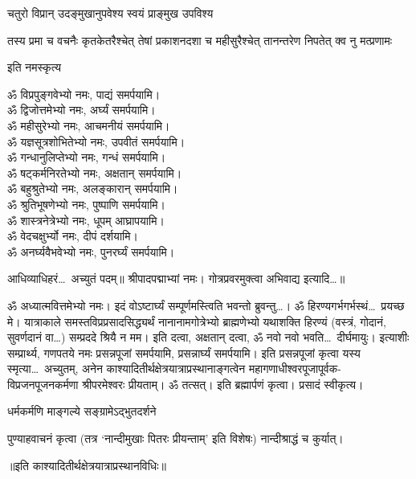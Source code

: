 
चतुरो विप्रान् उदङ्मुखानुपवेश्य स्वयं प्राङ्मुख उपविश्य

\begin{center}
{तस्य प्रमा च वचनैः कृतकेतरैश्चेत्}
{तेषां प्रकाशनदशा च महीसुरैश्चेत्}
{तानन्तरेण निपतेत् क्व नु मत्प्रणामः}
\end{center}

इति नमस्कृत्य

\begin{center}
ॐ विप्रपुङ्गवेभ्यो नमः, पाद्यं समर्पयामि।\\
ॐ द्विजोत्तमेभ्यो नमः, अर्घ्यं समर्पयामि।\\
ॐ महीसुरेभ्यो नमः, आचमनीयं समर्पयामि।\\
ॐ यज्ञसूत्रशोभितेभ्यो नमः, उपवीतं समर्पयामि।\\
ॐ गन्धानुलिप्तेभ्यो नमः, गन्धं समर्पयामि।\\
ॐ षट्कर्मनिरतेभ्यो नमः, अक्षतान् समर्पयामि।\\
ॐ बहुश्रुतेभ्यो नमः, अलङ्कारान् समर्पयामि।\\
ॐ श्रुतिभूषणेभ्यो नमः, पुष्पाणि समर्पयामि।\\
ॐ शास्त्रनेत्रेभ्यो नमः, धूपम् आघ्रापयामि।\\
ॐ वेदचक्षुर्भ्यो नमः, दीपं दर्शयामि।\\
ॐ अनर्घ्यवैभवेभ्यो नमः, पुनरर्घ्यं समर्पयामि।
\end{center}


आधिव्याधिहरं\ldots\ अच्युतं पदम्॥ श्रीपादपद्माभ्यां नमः।
गोत्रप्रवरमुक्त्वा अभिवाद्य इत्यादि\ldots॥

ॐ अध्यात्मवित्तमेभ्यो नमः। इदं वोऽष्टार्घ्यं सम्पूर्णमस्त्विति भवन्तो ब्रुवन्तु\ldots।
ॐ हिरण्यगर्भगर्भस्थं\ldots\ प्रयच्छ मे।
यात्राकाले समस्तविप्रप्रसादसिद्ध्यर्थं नानानामगोत्रेभ्यो ब्राह्मणेभ्यो यथाशक्ति हिरण्यं
(वस्त्रं, गोदानं, सुवर्णदानं वा\ldots) सम्प्रददे श्रियै न मम। इति दत्वा, अक्षतान् दत्वा,
ॐ नवो नवो भवति\ldots\ दीर्घमायुः। इत्याशीः सम्प्रार्थ्य, गणपतये नमः प्रसन्नपूजां समर्पयामि,
प्रसन्नार्घ्यं समर्पयामि। इति प्रसन्नपूजां कृत्वा यस्य स्मृत्या\ldots\ अच्युतम्, अनेन
काश्यादितीर्थक्षेत्रयात्राप्रस्थानाङ्गत्वेन महागणाधीश्वरपूजापूर्वक-विप्रजनपूजनकर्मणा
श्रीपरमेश्वरः प्रीयताम्। ॐ तत्सत्। इति ब्रह्मार्पणं कृत्वा। प्रसादं स्वीकृत्य।


{धर्मकर्मणि माङ्गल्ये सङ्ग्रामेऽद्भुतदर्शने}

पुण्याहवाचनं कृत्वा (तत्र `नान्दीमुखाः पितरः प्रीयन्ताम्' इति विशेषः) नान्दीश्राद्धं च कुर्यात्।

\centerline{॥इति काश्यादितीर्थक्षेत्रयात्राप्रस्थानविधिः॥}
